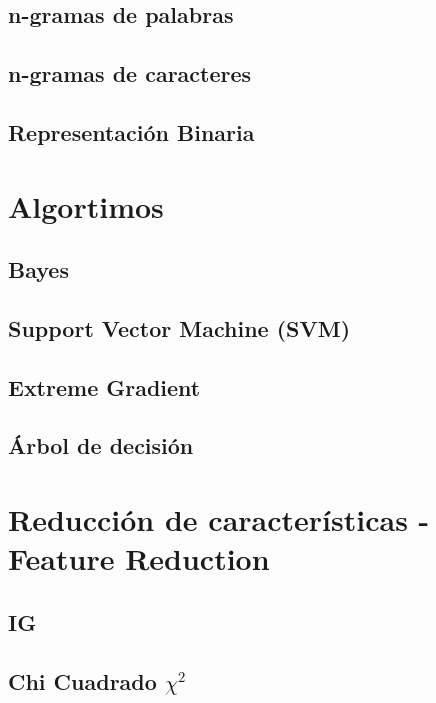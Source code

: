 \documentclass[12pt, runningheads,a4]{book}
\begin{document}
	\subsection{n-gramas de palabras}

	\subsection{n-gramas de caracteres}

	\subsection{Representación Binaria}

\section{Algortimos}

	\subsection{Bayes}

	\subsection{Support Vector Machine (SVM)}

	\subsection{Extreme Gradient}

	\subsection{Árbol de decisión}

\section{Reducción de características -Feature Reduction}

	\subsection{IG}

	\subsection{Chi Cuadrado ${\chi}^2$ }
\end{document}
